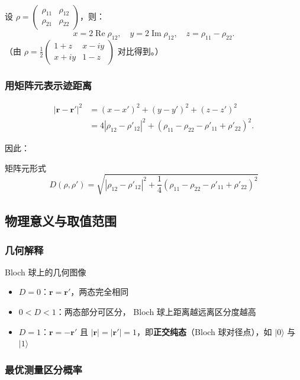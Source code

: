 设 $\rho = \begin{pmatrix}\rho_{11} & \rho_{12} \\ \rho_{21} & \rho_{22}\end{pmatrix}$，则：
\[
  x = 2\operatorname{Re}\rho_{12}, \quad
  y = 2\operatorname{Im}\rho_{12}, \quad
  z = \rho_{11} - \rho_{22}.
\]
（由 $\rho = \frac12\begin{pmatrix}1+z & x-iy \\ x+iy & 1-z\end{pmatrix}$ 对比得到。）

\subsubsection{用矩阵元表示迹距离}

\begin{align*}
  |\bm r - \bm r'|^2
  &= (x-x')^2 + (y-y')^2 + (z-z')^2 \\
  &= 4|\rho_{12}-\rho'_{12}|^2 + (\rho_{11}-\rho_{22}-\rho'_{11}+\rho'_{22})^2.
\end{align*}

因此：
\begin{formulabox}{矩阵元形式}
\[
  \boxed{D(\rho,\rho') = \sqrt{|\rho_{12}-\rho'_{12}|^2 + \frac14(\rho_{11}-\rho_{22}-\rho'_{11}+\rho'_{22})^2}}
\]
\end{formulabox}


\subsection{物理意义与取值范围}

\subsubsection{几何解释}

\begin{insightbox}{Bloch 球上的几何图像}
\begin{itemize}[nosep]
  \item $D=0$：$\bm r = \bm r'$，两态完全相同
  \item $0<D<1$：两态部分可区分， Bloch 球上距离越远离区分度越高
  \item $D=1$：$\bm r = -\bm r'$ 且 $|\bm r|=|\bm r'|=1$，即\textbf{正交纯态}（Bloch 球对径点），如 $|0\rangle$ 与 $|1\rangle$
\end{itemize}
\end{insightbox}

\subsubsection{最优测量区分概率}

